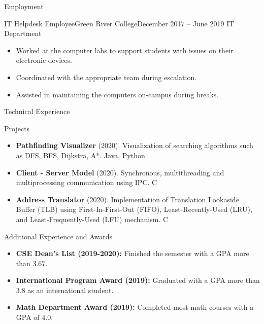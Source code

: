 \documentclass[]{mcdowellcv}
\begin{document}
\begin{cvsection}{Employment}
		\begin{cvsubsection}{IT Helpdesk Employee}{Green River College}{December 2017 -- June 2019}
		    IT Department
		    \begin{itemize}
		        \item Worked at the computer labs to support students with issues on their electronic devices.
		        \item Coordinated with the appropriate team during escalation.
		        \item Assisted in maintaining the computers on-campus during breaks.
		    \end{itemize}
		\end{cvsubsection}
	\end{cvsection}
	
	\begin{cvsection}{Technical Experience}
		\begin{cvsubsection}{Projects}{}{}
			\begin{itemize}
				\item \textbf{Pathfinding Visualizer} (2020). Visualization of searching algorithms such as DFS, BFS, Dijkstra, A*.  Java, Python
				\item \textbf{Client - Server Model} (2020). Synchronous, multithreading and multiprocessing communication using IPC. C
				\item \textbf{Address Translator} (2020). Implementation of Translation Lookaside Buffer (TLB) using First-In-First-Out (FIFO), Least-Recently-Used (LRU), and Least-Frequently-Used (LFU) mechanism. C
			\end{itemize}
		\end{cvsubsection}
	\end{cvsection}
	
	\begin{cvsection}{Additional Experience and Awards}
		\begin{cvsubsection}{}{}{}	
			\begin{itemize}
			    \item \textbf{CSE Dean's List (2019-2020):} Finished the semester with a GPA more than 3.67.
				\item \textbf{International Program Award (2019):} Graduated with a GPA more than 3.8 as an international student.
				\item \textbf{Math Department Award (2019):} Completed most math courses with a GPA of 4.0.
			\end{itemize}
		\end{cvsubsection}
	\end{cvsection}
	
\end{document}

